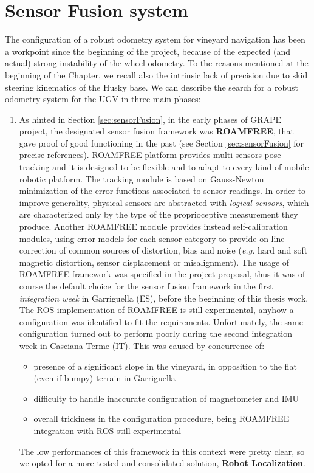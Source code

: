 \section{Sensor Fusion system}\label{sec:odometrySystem}

The configuration of a robust odometry system for vineyard navigation has been a workpoint since the beginning of the project, because of the expected (and actual) strong instability of the wheel odometry. To the reasons mentioned at the beginning of the Chapter, we recall also the intrinsic lack of precision due to skid steering kinematics of the Husky base.
We can describe the search for a robust odometry system for the \ac{UGV} in three main phases:
\begin{enumerate}
	\item As hinted in Section \ref{sec:sensorFusion}, in the early phases of \ac{GRAPE} project, the designated sensor fusion framework was \textbf{ROAMFREE}, that gave proof of good functioning in the past (see Section \ref{sec:sensorFusion} for precise references). ROAMFREE platform provides multi-sensors pose tracking and it is designed to be flexible and to adapt to every kind of mobile robotic platform. The tracking module is based on Gauss-Newton minimization of the error functions associated to sensor readings. In order to improve generality, physical sensors are abstracted with \textit{logical sensors}, which are characterized only by the type of the proprioceptive measurement they produce. Another ROAMFREE module provides instead self-calibration modules, using error models for each sensor category to provide on-line correction of common sources of distortion, bias and noise (\textit{e.g.} hard and soft magnetic distortion, sensor displacement or misalignment). The usage of ROAMFREE framework was specified in the project proposal, thus it was of course the default choice for the sensor fusion framework in the first \textit{integration week} in Garriguella (ES), before the beginning of this thesis work. The \ac{ROS} implementation of ROAMFREE is still experimental, anyhow a configuration was identified to fit the requirements. Unfortunately, the same configuration turned out to perform poorly during the second integration week in Casciana Terme (IT). This was caused by concurrence of:
	\begin{itemize}
		\item presence of a significant slope in the vineyard, in opposition to the flat (even if bumpy) terrain in Garriguella
		\item difficulty to handle inaccurate configuration of magnetometer and \ac{IMU}
		\item overall trickiness in the configuration procedure, being ROAMFREE integration with \ac{ROS} still experimental
	\end{itemize}
	The low performances of this framework in this context were pretty clear, so we opted for a more tested and consolidated solution, \textbf{Robot Localization}.
	

\end{enumerate}
